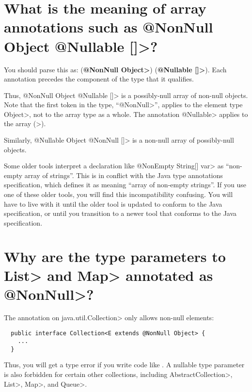 \section{What is the meaning of array annotations such as \<@NonNull Object @Nullable []>?\label{faq-array-syntax-meaning}}

You should parse this as:
(\textbf{\<@NonNull Object>}) (\textbf{\<@Nullable []>}).
Each annotation precedes the component of the type that it qualifies.

Thus,
\<@NonNull Object @Nullable []> is a possibly-null array of non-null
objects.  Note that the first token in the type,
``\<@NonNull>'', applies to the element
type \<Object>, not to the array type as a whole.  The annotation \<@Nullable> applies to the
array (\<[]>).

Similarly,
\<@Nullable Object @NonNull []> is a non-null array of possibly-null
objects.


Some older tools interpret a declaration like \<@NonEmpty String[] var> as
``non-empty array of strings''.  This is in conflict with the Java type
annotations specification, which defines it as meaning ``array of
non-empty strings''.
If you use one of these
older tools, you will find this incompatibility confusing.
You will have to live with it until the older
tool is updated to conform to the Java specification, or until you
transition to a newer tool that conforms to the Java specification.


\section{Why are the type parameters to \<List> and \<Map> annotated as \<@NonNull>?\label{faq-list-map-nonnull-typeargs}}

The annotation on \<java.util.Collection> only allows non-null elements:

\begin{Verbatim}
  public interface Collection<E extends @NonNull Object> {
    ...
  }
\end{Verbatim}

\noindent
Thus, you will get a type error if you write code like
.
A nullable
type parameter is also forbidden for certain other collections, including
\<AbstractCollection>, \<List>, \<Map>, and \<Queue>.



